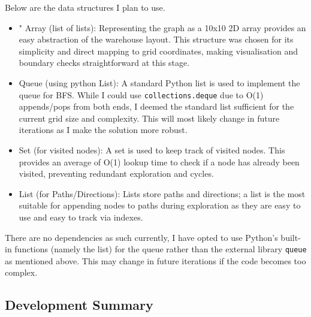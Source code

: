 Below are the data structures I plan to use.
\begin{itemize}
    \item " Array (list of lists): Representing the graph as a 10x10 2D array provides an easy abstraction of the warehouse layout. This structure was chosen for its simplicity and direct mapping to grid coordinates, making visualisation and boundary checks straightforward at this stage.
    \item Queue (using python List): A standard Python list is used to implement the queue for BFS. While I could use \verb|collections.deque| due to O(1) appends/pops from both ends, I deemed the standard list sufficient for the current grid size and complexity. This will most likely change in future iterations as I make the solution more robust.
    \item Set (for visited nodes): A set is used to keep track of visited nodes. This provides an average of O(1) lookup time to check if a node has already been visited, preventing redundant exploration and cycles.
    \item List (for Paths/Directions): Lists store paths and directions; a list is the most suitable for appending nodes to paths during exploration as they are easy to use and easy to track via indexes.

\end{itemize}

There are no dependencies as such currently, I have opted to use Python's built-in functions (namely the list) for the queue rather than the external library \verb|queue| as mentioned above. This may change in future iterations if the code becomes too complex.


\subsection{Development Summary}

